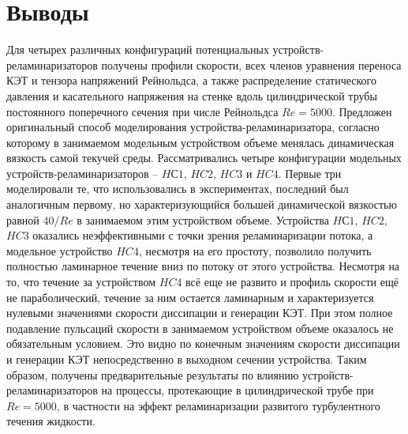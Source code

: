 \section{Выводы}\label{ch3:conclusion}
%
Для четырех различных конфигураций потенциальных устройств-реламинаризаторов получены профили скорости, всех членов уравнения переноса КЭТ и тензора напряжений Рейнольдса, 
а также распределение статического давления и касательного напряжения на стенке вдоль цилиндрической трубы постоянного поперечного сечения при числе Рейнольдса $Re = 5000$. 
%
Предложен оригинальный способ моделирования устройства-реламинаризатора, согласно которому в занимаемом модельным устройством объеме менялась динамическая вязкость самой текучей среды. 
%
Рассматривались четыре конфигурации модельных устройств-реламинаризаторов -- $HС1$, $HC2$, $HC3$ и $HC4$. 
%
Первые три моделировали те, что использовались в экспериментах, последний был аналогичным первому, но характеризующийся большей динамической вязкостью равной $40/Re$ в занимаемом этим устройством объеме. 
%
Устройства $HС1$, $HC2$, $HC3$ оказались неэффективными с точки зрения реламинаризации потока, а модельное устройство $HC4$, несмотря на его простоту, позволило получить полностью ламинарное течение вниз по потоку от этого устройства. 
%
Несмотря на то, что течение за устройством $HC4$ всё еще не развито и профиль скорости ещё не параболический, течение за ним остается ламинарным и характеризуется нулевыми значениями скорости диссипации и генерации КЭТ. 
%
При этом полное подавление пульсаций скорости в занимаемом устройством объеме оказалось не обязательным условием. 
%
Это видно по конечным значениям скорости диссипации и генерации КЭТ непосредственно в выходном сечении устройства. 
%
Таким образом, получены предварительные результаты по влиянию устройств-реламинаризаторов на процессы, протекающие в цилиндрической трубе при $Re = 5000$, в частности на эффект реламинаризации развитого турбулентного течения жидкости.






